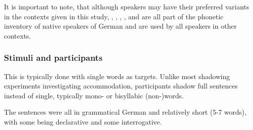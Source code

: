 It is important to note, that although speakers may have their preferred variants in the contexts given in this study, \textipa{[E:]}, \textipa{[e:]}, \textipa{[Ik]}, \textipa{[\s n]}, and \textipa{[@n]} are all part of the phonetic inventory of native speakers of German and are used by all speakers in other contexts. 

\subsubsection{Stimuli and participants}
\label{subsubsec:stimuli_participant_hci}

This is typically done with single words as targets.
Unlike most shadowing experiments investigating accommodation, participants shadow full sentences instead of single, typically mono- or bisyllabic (non-)words.

The sentences were all in grammatical German and relatively short (5-7 words), with some being declarative and some interrogative.


